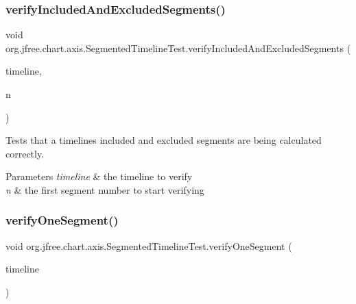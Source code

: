 \subsubsection{\texorpdfstring{verify\+Included\+And\+Excluded\+Segments()}{verifyIncludedAndExcludedSegments()}}
{\footnotesize\ttfamily void org.\+jfree.\+chart.\+axis.\+Segmented\+Timeline\+Test.\+verify\+Included\+And\+Excluded\+Segments (\begin{DoxyParamCaption}\item[{\mbox{\hyperlink{classorg_1_1jfree_1_1chart_1_1axis_1_1_segmented_timeline}{Segmented\+Timeline}}}]{timeline,  }\item[{long}]{n }\end{DoxyParamCaption})}

Tests that a timeline\textquotesingle{}s included and excluded segments are being calculated correctly.


\begin{DoxyParams}{Parameters}
{\em timeline} & the timeline to verify \\
\hline
{\em n} & the first segment number to start verifying \\
\hline
\end{DoxyParams}
\mbox{\label{classorg_1_1jfree_1_1chart_1_1axis_1_1_segmented_timeline_test_aba4f8e62a3d03229adc65c892923188b}} 
\subsubsection{\texorpdfstring{verify\+One\+Segment()}{verifyOneSegment()}}
{\footnotesize\ttfamily void org.\+jfree.\+chart.\+axis.\+Segmented\+Timeline\+Test.\+verify\+One\+Segment (\begin{DoxyParamCaption}\item[{\mbox{\hyperlink{classorg_1_1jfree_1_1chart_1_1axis_1_1_segmented_timeline}{Segmented\+Timeline}}}]{timeline }\end{DoxyParamCaption})}

